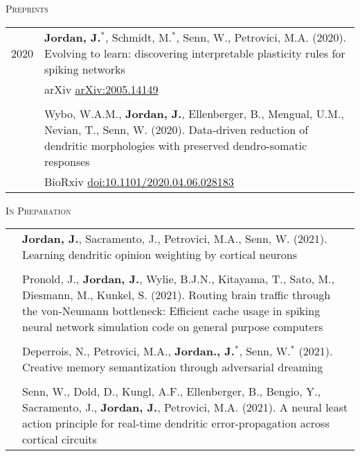 \textsc{Preprints}
\begin{longtable}{>{\hfill}p{1.6cm} p{}}
  2020 & \textbf{Jordan, J.}$^*$, Schmidt, M.$^*$, Senn, W., Petrovici, M.A. (2020). Evolving to learn: discovering interpretable plasticity rules for spiking networks \\
       & arXiv \href{https://arxiv.org/abs/2005.14149}{arXiv:2005.14149} \\
  \multicolumn{2}{c}{} \\
       & Wybo, W.A.M., \textbf{Jordan, J.}, Ellenberger, B., Mengual, U.M., Nevian, T., Senn, W. (2020). Data-driven reduction of dendritic morphologies with preserved dendro-somatic responses \\
       & BioRxiv \href{https://doi.org/10.1101/2020.04.06.028183}{doi:10.1101/2020.04.06.028183}
\end{longtable}

\textsc{In Preparation}
\begin{longtable}{>{\hfill}p{1.6cm} p{}}
  & \textbf{Jordan, J.}, Sacramento, J., Petrovici, M.A., Senn, W. (2021). Learning dendritic opinion weighting by cortical neurons \\
  \multicolumn{2}{c}{} \\
  & Pronold, J., \textbf{Jordan, J.}, Wylie, B.J.N., Kitayama, T., Sato, M., Diesmann, M., Kunkel, S. (2021). Routing brain traffic through the von-Neumann bottleneck: Efficient cache usage in spiking neural network simulation code on general purpose computers \\
  \multicolumn{2}{c}{} \\
  & Deperrois, N., Petrovici, M.A., \textbf{Jordan., J.}$^*$, Senn, W.$^*$ (2021). Creative memory semantization through adversarial dreaming \\
  \multicolumn{2}{c}{} \\
  & Senn, W., Dold, D., Kungl, A.F., Ellenberger, B., Bengio, Y., Sacramento, J., \textbf{Jordan, J.}, Petrovici, M.A. (2021). A neural least action principle for real-time dendritic error-propagation across cortical circuits
\end{longtable}

